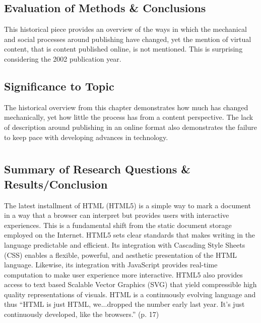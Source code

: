 \documentclass[leavefloats]{apa6e}\usepackage[]{graphicx}\usepackage[]{color}
\begin{document}
\subsection{Evaluation of Methods \& Conclusions} %
This historical piece provides an overview of the ways in which the mechanical and social processes around publishing have changed, yet the mention of virtual content, that is content published online, is not mentioned.  This is surprising considering the 2002 publication year.

\subsection{Significance to Topic} %
The historical overview from this chapter demonstrates how much has changed mechanically, yet how little the process has from a content perspective.  The lack of description around publishing in an online format also demonstrates the failure to keep pace with developing advances in technology.


 \section{\textcite{Anthes2012}}





\regpar



\subsection{Summary of Research Questions \& Results/Conclusion} %
The latest installment of HTML (HTML5) is a simple way to mark a document in a way that a browser can interpret but provides users with interactive experiences.  This is a fundamental shift from the static document storage employed on the Internet.  HTML5 sets clear standards that makes writing in the language predictable and efficient.  Its integration with Cascading  Style Sheets (CSS) enables a flexible, powerful, and aesthetic presentation of the HTML language.  Likewise, its integration with JavaScript provides real-time computation to make user experience more interactive.  HTML5 also provides access to  text based Scalable  Vector Graphics (SVG) that yield compressible high quality representations of visuals.  HTML is a continuously evolving language and thus ``HTML is just HTML, we...dropped the number early last year. It's just continuously developed, like the browsers.'' (p. 17)
\end{document}
